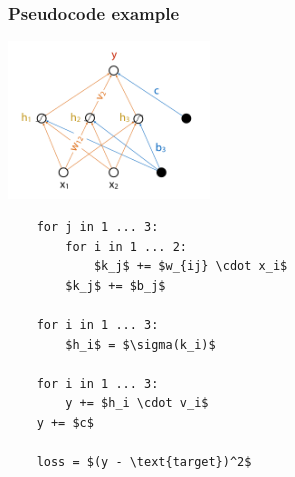 \documentclass[12pt]{article}
\begin{document}
\subsubsection*{Pseudocode example}
\begin{multicols}{2}
    
    \includegraphics[width=0.4\textwidth]{assets/FNN.png}

    \columnbreak

    \begin{lstlisting}
    for j in 1 ... 3: 
        for i in 1 ... 2:
            $k_j$ += $w_{ij} \cdot x_i$
        $k_j$ += $b_j$

    for i in 1 ... 3:
        $h_i$ = $\sigma(k_i)$

    for i in 1 ... 3:
        y += $h_i \cdot v_i$
    y += $c$

    loss = $(y - \text{target})^2$
    \end{lstlisting}
\end{multicols}
\end{document}
